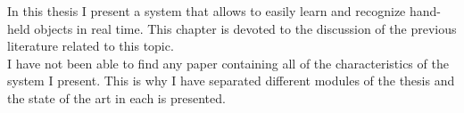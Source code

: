 







In this thesis I present a system that allows to easily learn and recognize hand-held objects in real time. 
This chapter is devoted to the discussion of the previous literature related to this topic. 
\\

I have not been able  to find any paper containing all of the characteristics of the system I present. 
This is why I have separated different modules of the thesis and the state of the art in each is presented. 
